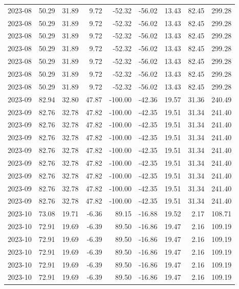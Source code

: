 \begin{table}[ht]
\begin{tabular}{lrrrrrrrr}
  2023-08 & 50.29 & 31.89 & 9.72 & -52.32 & -56.02 & 13.43 & 82.45 & 299.28 \\ 
  2023-08 & 50.29 & 31.89 & 9.72 & -52.32 & -56.02 & 13.43 & 82.45 & 299.28 \\ 
  2023-08 & 50.29 & 31.89 & 9.72 & -52.32 & -56.02 & 13.43 & 82.45 & 299.28 \\ 
  2023-08 & 50.29 & 31.89 & 9.72 & -52.32 & -56.02 & 13.43 & 82.45 & 299.28 \\ 
  2023-08 & 50.29 & 31.89 & 9.72 & -52.32 & -56.02 & 13.43 & 82.45 & 299.28 \\ 
  2023-08 & 50.29 & 31.89 & 9.72 & -52.32 & -56.02 & 13.43 & 82.45 & 299.28 \\ 
  2023-08 & 50.29 & 31.89 & 9.72 & -52.32 & -56.02 & 13.43 & 82.45 & 299.28 \\ 
  2023-09 & 82.94 & 32.80 & 47.87 & -100.00 & -42.36 & 19.57 & 31.36 & 240.49 \\ 
  2023-09 & 82.76 & 32.78 & 47.82 & -100.00 & -42.35 & 19.51 & 31.34 & 241.40 \\ 
  2023-09 & 82.76 & 32.78 & 47.82 & -100.00 & -42.35 & 19.51 & 31.34 & 241.40 \\ 
  2023-09 & 82.76 & 32.78 & 47.82 & -100.00 & -42.35 & 19.51 & 31.34 & 241.40 \\ 
  2023-09 & 82.76 & 32.78 & 47.82 & -100.00 & -42.35 & 19.51 & 31.34 & 241.40 \\ 
  2023-09 & 82.76 & 32.78 & 47.82 & -100.00 & -42.35 & 19.51 & 31.34 & 241.40 \\ 
  2023-09 & 82.76 & 32.78 & 47.82 & -100.00 & -42.35 & 19.51 & 31.34 & 241.40 \\ 
  2023-09 & 82.76 & 32.78 & 47.82 & -100.00 & -42.35 & 19.51 & 31.34 & 241.40 \\ 
  2023-09 & 82.76 & 32.78 & 47.82 & -100.00 & -42.35 & 19.51 & 31.34 & 241.40 \\ 
  2023-10 & 73.08 & 19.71 & -6.36 & 89.15 & -16.88 & 19.52 & 2.17 & 108.71 \\ 
  2023-10 & 72.91 & 19.69 & -6.39 & 89.50 & -16.86 & 19.47 & 2.16 & 109.19 \\ 
  2023-10 & 72.91 & 19.69 & -6.39 & 89.50 & -16.86 & 19.47 & 2.16 & 109.19 \\ 
  2023-10 & 72.91 & 19.69 & -6.39 & 89.50 & -16.86 & 19.47 & 2.16 & 109.19 \\ 
  2023-10 & 72.91 & 19.69 & -6.39 & 89.50 & -16.86 & 19.47 & 2.16 & 109.19 \\ 
  2023-10 & 72.91 & 19.69 & -6.39 & 89.50 & -16.86 & 19.47 & 2.16 & 109.19 \\ 

\end{tabular}
\end{table}
